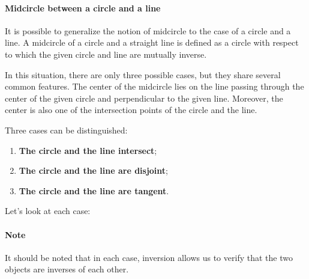 \paragraph*{Midcircle between a circle and a line}
It is possible to generalize the notion of midcircle to the case of a circle and a line.
A midcircle of a circle and a straight line is defined as a circle with respect to which the given circle and line are mutually inverse.

\noindent
In this situation, there are only three possible cases, but they share several common features.
The center of the midcircle lies on the line passing through the center of the given circle and perpendicular to the given line.
Moreover, the center is also one of the intersection points of the circle and the line.

Three cases can be distinguished:

\begin{enumerate}[label=(\roman*)]
  \item \textbf{The circle and the line intersect};
  \item \textbf{The circle and the line are disjoint};
  \item \textbf{The circle and the line are tangent}.
\end{enumerate}

Let's look at each case:

\paragraph*{Note} It should be noted that in each case, inversion allows us to verify that the two objects are inverses of each other.


